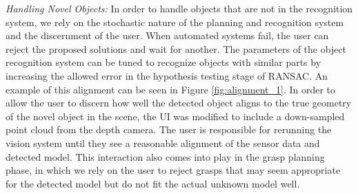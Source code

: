 \emph{Handling Novel Objects:} In order to handle objects that are not in the recognition system, we rely on the stochastic nature of the planning and recognition system and the discernment of the user. When automated systems fail, the user can reject the proposed solutions and wait for another. The parameters of the object recognition system can be tuned to recognize objects with similar parts by increasing the allowed error in the hypothesis testing stage of RANSAC. An example of this alignment can be seen in Figure \ref{fig:alignment_1}. In order to allow the user to discern how well the detected object aligns to the true geometry of the novel object in the scene, the UI was modified to include a down-sampled point cloud from the depth camera. The user is responsible for rerunning the vision system until they see a reasonable alignment of the sensor data and detected model. This interaction also comes into play in the grasp planning phase, in which we rely on the user to reject grasps that may seem appropriate for the detected model but do not fit the actual unknown model well. 




%

